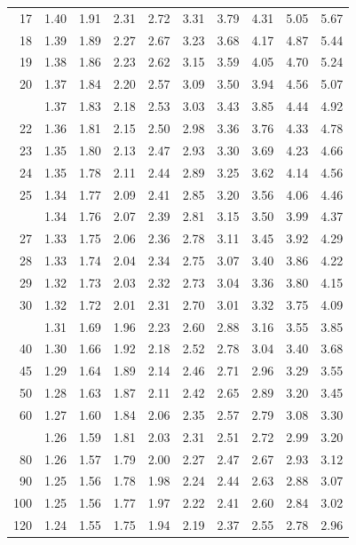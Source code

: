 \documentclass[10pt]{article}
\begin{document}
\begin{longtable}{@{}r!{\vrule width 0.8pt\hspace{0.55em}}rrrrrrrrr@{}}
17 & 1.40 & 1.91 & 2.31 & 2.72 & 3.31 & 3.79 & 4.31 & 5.05 & 5.67 \\
18 & 1.39 & 1.89 & 2.27 & 2.67 & 3.23 & 3.68 & 4.17 & 4.87 & 5.44 \\
19 & 1.38 & 1.86 & 2.23 & 2.62 & 3.15 & 3.59 & 4.05 & 4.70 & 5.24 \\
20 & 1.37 & 1.84 & 2.20 & 2.57 & 3.09 & 3.50 & 3.94 & 4.56 & 5.07 \\
 & 1.37 & 1.83 & 2.18 & 2.53 & 3.03 & 3.43 & 3.85 & 4.44 & 4.92 \\
22 & 1.36 & 1.81 & 2.15 & 2.50 & 2.98 & 3.36 & 3.76 & 4.33 & 4.78 \\
23 & 1.35 & 1.80 & 2.13 & 2.47 & 2.93 & 3.30 & 3.69 & 4.23 & 4.66 \\
24 & 1.35 & 1.78 & 2.11 & 2.44 & 2.89 & 3.25 & 3.62 & 4.14 & 4.56 \\
25 & 1.34 & 1.77 & 2.09 & 2.41 & 2.85 & 3.20 & 3.56 & 4.06 & 4.46 \\
 & 1.34 & 1.76 & 2.07 & 2.39 & 2.81 & 3.15 & 3.50 & 3.99 & 4.37 \\
27 & 1.33 & 1.75 & 2.06 & 2.36 & 2.78 & 3.11 & 3.45 & 3.92 & 4.29 \\
28 & 1.33 & 1.74 & 2.04 & 2.34 & 2.75 & 3.07 & 3.40 & 3.86 & 4.22 \\
29 & 1.32 & 1.73 & 2.03 & 2.32 & 2.73 & 3.04 & 3.36 & 3.80 & 4.15 \\
30 & 1.32 & 1.72 & 2.01 & 2.31 & 2.70 & 3.01 & 3.32 & 3.75 & 4.09 \\
 & 1.31 & 1.69 & 1.96 & 2.23 & 2.60 & 2.88 & 3.16 & 3.55 & 3.85 \\
40 & 1.30 & 1.66 & 1.92 & 2.18 & 2.52 & 2.78 & 3.04 & 3.40 & 3.68 \\
45 & 1.29 & 1.64 & 1.89 & 2.14 & 2.46 & 2.71 & 2.96 & 3.29 & 3.55 \\
50 & 1.28 & 1.63 & 1.87 & 2.11 & 2.42 & 2.65 & 2.89 & 3.20 & 3.45 \\
60 & 1.27 & 1.60 & 1.84 & 2.06 & 2.35 & 2.57 & 2.79 & 3.08 & 3.30 \\
 & 1.26 & 1.59 & 1.81 & 2.03 & 2.31 & 2.51 & 2.72 & 2.99 & 3.20 \\
80 & 1.26 & 1.57 & 1.79 & 2.00 & 2.27 & 2.47 & 2.67 & 2.93 & 3.12 \\
90 & 1.25 & 1.56 & 1.78 & 1.98 & 2.24 & 2.44 & 2.63 & 2.88 & 3.07 \\
100 & 1.25 & 1.56 & 1.77 & 1.97 & 2.22 & 2.41 & 2.60 & 2.84 & 3.02 \\
120 & 1.24 & 1.55 & 1.75 & 1.94 & 2.19 & 2.37 & 2.55 & 2.78 & 2.96 \\

\end{longtable}
\end{document}
